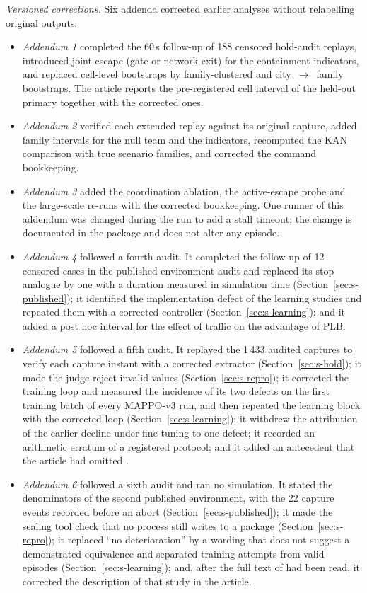 \documentclass[preprint,12pt]{elsarticle}
\begin{document}
\emph{Versioned corrections.} Six addenda corrected earlier analyses without relabelling original outputs:
\begin{itemize}
\item \emph{Addendum 1} completed the 60\,s follow-up of 188 censored hold-audit replays, introduced joint escape
(gate or network exit) for the containment indicators, and replaced cell-level bootstraps by family-clustered and
city~$\to$~family bootstraps. The article reports the pre-registered cell interval of the held-out primary together
with the corrected ones.
\item \emph{Addendum 2} verified each extended replay against its original capture, added family intervals for the
null team and the indicators, recomputed the KAN comparison with true scenario families, and corrected the command
bookkeeping.
\item \emph{Addendum 3} added the coordination ablation, the active-escape probe and the large-scale re-runs with the
corrected bookkeeping. One runner of this addendum was changed during the run to add a stall timeout; the change is
documented in the package and does not alter any episode.
\item \emph{Addendum 4} followed a fourth audit. It completed the follow-up of 12 censored cases in the
published-environment audit and replaced its stop analogue by one with a duration measured in simulation time
(Section~\ref{sec:s-published}); it identified the implementation defect of the learning studies and repeated them
with a corrected controller (Section~\ref{sec:s-learning}); and it added a post hoc interval for the effect of
traffic on the advantage of PLB.
\item \emph{Addendum 5} followed a fifth audit. It replayed the 1\,433 audited captures to verify each capture instant
with a corrected extractor (Section~\ref{sec:s-hold}); it made the judge reject invalid values
(Section~\ref{sec:s-repro}); it corrected the training loop and measured the incidence of its two defects on the
first training batch of every MAPPO-v3 run, and then repeated the learning block with the corrected loop
(Section~\ref{sec:s-learning}); it withdrew the attribution of the earlier decline under fine-tuning to one defect; it recorded an arithmetic erratum of a registered protocol; and it added
an antecedent that the article had omitted \cite{bykov2025interceptor}.
\item \emph{Addendum 6} followed a sixth audit and ran no simulation. It stated the denominators of the second
published environment, with the 22 capture events recorded before an abort (Section~\ref{sec:s-published}); it made
the sealing tool check that no process still writes to a package (Section~\ref{sec:s-repro}); it replaced ``no
deterioration'' by a wording that does not suggest a demonstrated equivalence and separated training attempts from
valid episodes (Section~\ref{sec:s-learning}); and, after the full text of \cite{bykov2025interceptor} had been
read, it corrected the description of that study in the article.
\end{itemize}



\end{document}
